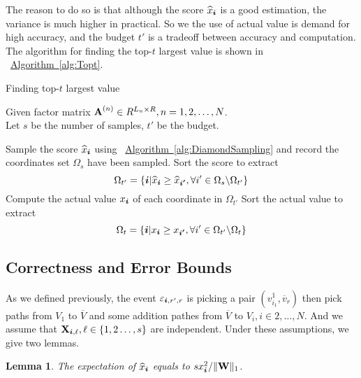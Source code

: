 \documentclass[letterpaper]{article}
\newcommand{\V}[1]{{\bm{{\MakeLowercase{#1}}}}}
\newcommand{\M}[1]{{\bm{\mathbf{\MakeUppercase{#1}}}}}
\newcommand{\norm}[2]{\|#1\|_{#2}}
\newcommand{\Alg}[1] {\hyperref[alg:#1] {Algorithm~\ref*{alg:#1}}}
\newtheorem{lemma}{Lemma}
\begin{document}
The reason to do so is that although the score $\widehat{x}_{\V{i}}$ is a good estimation, the variance is much higher in practical. So we the use of actual value is demand for high accuracy,
and the budget $t'$ is a tradeoff between accuracy and computation. The algorithm for finding the top-$t$ largest value is shown in ~\Alg{Topt}.
\begin{algorithm}[t]
    \caption{Finding top-$t$ largest value}
    \label{alg:Topt}
    Given factor matrix $\M{A}^{(n)}\in R^{L_n\times R}, n = 1,2,\ldots,N$.\\
    Let $s$ be the number of samples, $t'$ be the budget.
    \begin{algorithmic}[1]
    \State Sample the score $\widehat{x}_\V{i}$ using ~\Alg{DiamondSampling} and record the coordinates set $\Omega_s$ have been sampled.
    \State Sort the score to extract
    \[
        \Omega_{t'} = \{\V{i}|\widehat{x}_{\V{i}}\geq \widehat{x}_{\V{i'}},\forall i'\in \Omega_{s} \backslash \Omega_{t'}\}
    \]
    \State Compute the actual value $x_{\V{i}}$ of each coordinate in $\Omega_{t'}$
    \State Sort the actual value to extract
    \[
        \Omega_{t}=\{\V{i}|x_{\V{i}}\geq x_{\V{i'}},\forall i' \in \Omega_{t'} \backslash \Omega_{t} \}
    \]
    \end{algorithmic}
\end{algorithm}

\subsection{Correctness and Error Bounds}

As we defined previously, the event $\varepsilon_{\V{i},r',r}$ is picking a pair $(v^1_{i_1},\overline{v}_r)$ then pick paths from $V_1$ to $\overline{V}$ and some addition pathes from $\overline{V}$ to $V_i,i\in{2,\ldots,N}$. And we assume that $\M{X}_{\V{i},\ell},\ell\in\{1,2\ldots,s\}$ are independent. Under these assumptions, we give two lemmas.

\begin{lemma}\label{lem:Expectation}
The expectation of $\widehat{x}_{\V{i}}$ equals to $sx^2_{\V{i}}/\norm{\M{W}}{1}$.
\end{lemma}
\end{document}

